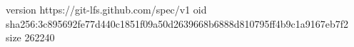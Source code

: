 version https://git-lfs.github.com/spec/v1
oid sha256:3c895692fe77d440c1851f09a50d2639668b6888d810795ff4b9c1a9167eb7f2
size 262240
